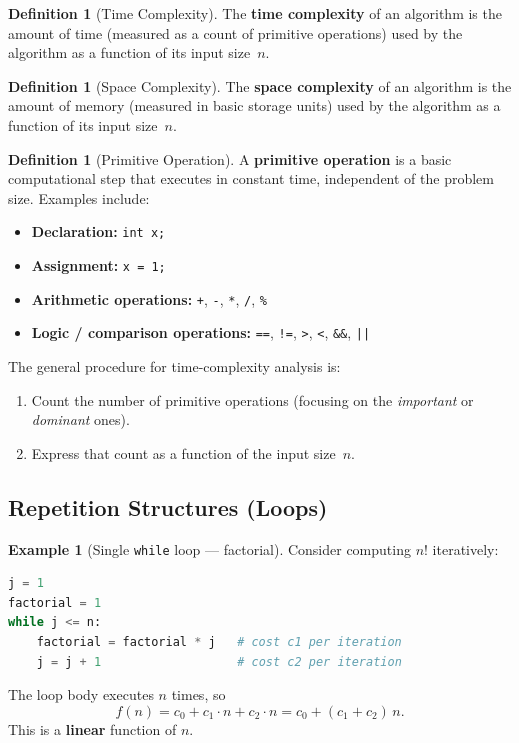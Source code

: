 \documentclass[11pt, a4paper, notitlepage]{report}
\theoremstyle{definition}
\newtheorem{definition}[theorem]{Definition}
\theoremstyle{remark}
\theoremstyle{definition}
\newtheorem{example}[theorem]{Example}
\begin{document}
\begin{definition}[Time Complexity]
\label{def:time-complexity}
The \textbf{time complexity} of an algorithm is the amount of time (measured as
a count of primitive operations) used by the algorithm as a function of its
input size~$n$.
\end{definition}

\begin{definition}[Space Complexity]
\label{def:space-complexity}
The \textbf{space complexity} of an algorithm is the amount of memory
(measured in basic storage units) used by the algorithm as a function of its
input size~$n$.
\end{definition}

\begin{definition}[Primitive Operation]
\label{def:primitive-op}
A \textbf{primitive operation} is a basic computational step that executes in
constant time, independent of the problem size.  Examples include:
\begin{itemize}
  \item \textbf{Declaration:} \texttt{int x;}
  \item \textbf{Assignment:} \texttt{x = 1;}
  \item \textbf{Arithmetic operations:} \texttt{+}, \texttt{-}, \texttt{*}, \texttt{/}, \texttt{\%}
  \item \textbf{Logic / comparison operations:} \texttt{==}, \texttt{!=}, \texttt{>}, \texttt{<}, \texttt{\&\&}, \texttt{||}
\end{itemize}
\end{definition}

The general procedure for time-complexity analysis is:
\begin{enumerate}
  \item Count the number of primitive operations (focusing on the
        \emph{important} or \emph{dominant} ones).
  \item Express that count as a function of the input size~$n$.
\end{enumerate}

\subsection{Repetition Structures (Loops)}
\label{subsec:loops}

\begin{example}[Single \texttt{while} loop --- factorial]
\label{ex:while-loop}
Consider computing $n!$ iteratively:
\begin{lstlisting}[language=Python]
j = 1
factorial = 1
while j <= n:
    factorial = factorial * j   # cost c1 per iteration
    j = j + 1                   # cost c2 per iteration
\end{lstlisting}
The loop body executes $n$ times, so
\[
  f(n) = c_0 + c_1 \cdot n + c_2 \cdot n = c_0 + (c_1 + c_2)\,n.
\]
This is a \textbf{linear} function of $n$.
\end{example}
\end{document}
